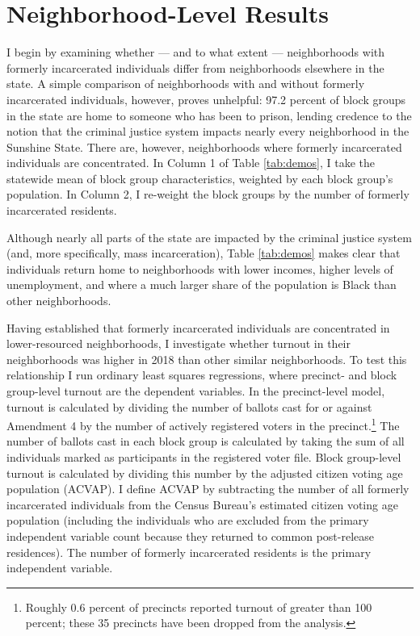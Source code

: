 \documentclass[
  12pt,
]{article}
\begin{document}
\hypertarget{neighborhood-level-results}{%
\section*{Neighborhood-Level Results}\label{neighborhood-level-results}}

I begin by examining whether --- and to what extent --- neighborhoods with formerly incarcerated individuals differ from neighborhoods elsewhere in the state. A simple comparison of neighborhoods with and without formerly incarcerated individuals, however, proves unhelpful: 97.2 percent of block groups in the state are home to someone who has been to prison, lending credence to the notion that the criminal justice system impacts nearly every neighborhood in the Sunshine State. There are, however, neighborhoods where formerly incarcerated individuals are concentrated. In Column 1 of Table \ref{tab:demos}, I take the statewide mean of block group characteristics, weighted by each block group's population. In Column 2, I re-weight the block groups by the number of formerly incarcerated residents.



Although nearly all parts of the state are impacted by the criminal justice system (and, more specifically, mass incarceration), Table \ref{tab:demos} makes clear that individuals return home to neighborhoods with lower incomes, higher levels of unemployment, and where a much larger share of the population is Black than other neighborhoods.

Having established that formerly incarcerated individuals are concentrated in lower-resourced neighborhoods, I investigate whether turnout in their neighborhoods was higher in 2018 than other similar neighborhoods. To test this relationship I run ordinary least squares regressions, where precinct- and block group-level turnout are the dependent variables. In the precinct-level model, turnout is calculated by dividing the number of ballots cast for or against Amendment 4 by the number of actively registered voters in the precinct.\footnote{Roughly 0.6 percent of precincts reported turnout of greater than 100 percent; these 35 precincts have been dropped from the analysis.} The number of ballots cast in each block group is calculated by taking the sum of all individuals marked as participants in the registered voter file. Block group-level turnout is calculated by dividing this number by the adjusted citizen voting age population (ACVAP). I define ACVAP by subtracting the number of all formerly incarcerated individuals from the Census Bureau's estimated citizen voting age population (including the individuals who are excluded from the primary independent variable count because they returned to common post-release residences). The number of formerly incarcerated residents is the primary independent variable.
\end{document}
